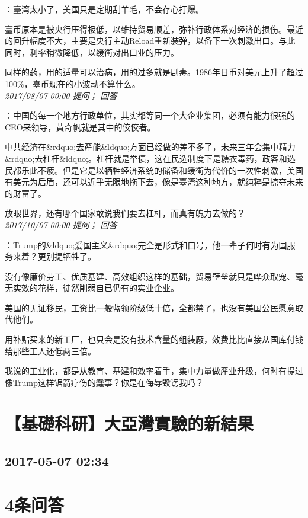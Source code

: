 \documentclass[twocolumn]{ctexart}
\begin{document}
：臺湾太小了，美国只是定期刮羊毛，不会存心打爆。

臺币原本是被央行压得极低，以维持贸易顺差，弥补行政体系对经济的损伤。最近的回升幅度不大，主要是央行主动Reload重新装弹，以备下一次刺激出口。与此同时，利率稍微降低，以缓衝对出口业的压力。

同样的药，用的适量可以治病，用的过多就是剧毒。1986年日币对美元上升了超过100\%，臺币现在的小波动不算什么。\\

\textit{\hfill\noindent\small 2017/08/07 00:00 提问； 回答}

：中国的每一个地方行政单位，其实都等同一个大企业集团，必须有能力很强的CEO来领导，黄奇帆就是其中的佼佼者。

中共经济在\&rdquo;去產能\&ldquo;方面已经做的差不多了，未来三年会集中精力\&rdquo;去杠杆\&ldquo;。杠杆就是举债，这在民选制度下是糖衣毒药，政客和选民都乐此不疲。但是它是以牺牲经济系统的储备和缓衝为代价的一次性刺激，美国有美元为后盾，还可以近乎无限地拖下去，像是臺湾这种地方，就纯粹是掠夺未来的财富了。

放眼世界，还有哪个国家敢说我们要去杠杆，而真有魄力去做的？\\

\textit{\hfill\noindent\small 2017/10/07 00:00 提问； 回答}

：Trump的\&ldquo;爱国主义\&rdquo;完全是形式和口号，他一辈子何时有为国服务来着？更别提牺牲了。

没有像廉价劳工、优质基建、高效组织这样的基础，贸易壁垒就只是哗众取宠、毫无实效的花样，徒然削弱自已仍有的实业企业。

美国的无证移民，工资比一般蓝领阶级低十倍，全都禁了，也没有美国公民愿意取代他们。

用补贴买来的新工厂，也只会是没有技术含量的组装厰，效费比比直接从国库付钱给那些工人还低两三倍。

我说的工业化，都是从教育、基建和效率着手，集中力量做產业升级，何时有提过像Trump这样锯箭疗伤的蠢事？你是在侮辱毁谤我吗？\\


\section{【基礎科研】大亞灣實驗的新結果}
\subsection{2017-05-07 02:34}


\section{4条问答}
\end{document}
